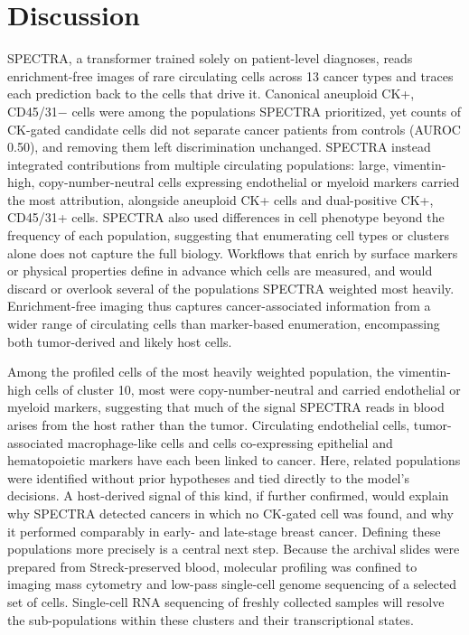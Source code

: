 \documentclass[11pt]{article}
\begin{document}
\section*{Discussion}

SPECTRA, a transformer trained solely on patient-level diagnoses, reads enrichment-free images of rare circulating cells across 13 cancer types and traces each prediction back to the cells that drive it. Canonical aneuploid CK+, CD45/31$-$ cells were among the populations SPECTRA prioritized, yet counts of CK-gated candidate cells did not separate cancer patients from controls (AUROC 0.50), and removing them left discrimination unchanged. SPECTRA instead integrated contributions from multiple circulating populations: large, vimentin-high, copy-number-neutral cells expressing endothelial or myeloid markers carried the most attribution, alongside aneuploid CK+ cells and dual-positive CK+, CD45/31+ cells. SPECTRA also used differences in cell phenotype beyond the frequency of each population, suggesting that enumerating cell types or clusters alone does not capture the full biology. Workflows that enrich by surface markers or physical properties define in advance which cells are measured\cite{allard2004,nagrath2007,vona2000,ozkumur2013,sollier2014}, and would discard or overlook several of the populations SPECTRA weighted most heavily. Enrichment-free imaging thus captures cancer-associated information from a wider range of circulating cells than marker-based enumeration, encompassing both tumor-derived and likely host cells.

Among the profiled cells of the most heavily weighted population, the vimentin-high cells of cluster 10, most were copy-number-neutral and carried endothelial or myeloid markers, suggesting that much of the signal SPECTRA reads in blood arises from the host rather than the tumor. Circulating endothelial cells, tumor-associated macrophage-like cells and cells co-expressing epithelial and hematopoietic markers have each been linked to cancer\cite{bertolini2006,adams2014,ao2015,gast2018,higa2025,naghdloo2025caught}. Here, related populations were identified without prior hypotheses and tied directly to the model's decisions. A host-derived signal of this kind, if further confirmed, would explain why SPECTRA detected cancers in which no CK-gated cell was found, and why it performed comparably in early- and late-stage breast cancer. Defining these populations more precisely is a central next step. Because the archival slides were prepared from Streck-preserved blood, molecular profiling was confined to imaging mass cytometry and low-pass single-cell genome sequencing of a selected set of cells. Single-cell RNA sequencing of freshly collected samples will resolve the sub-populations within these clusters and their transcriptional states\cite{prabakar2024}.
\end{document}
